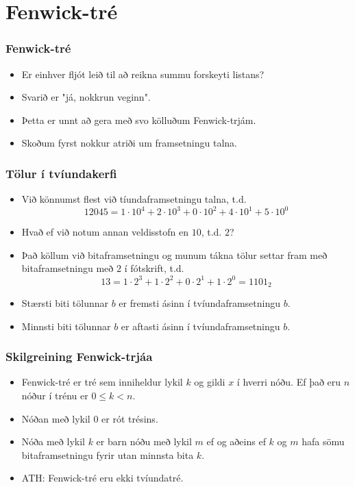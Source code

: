 \documentclass{beamer}
\begin{document}
\section[Fenwick-tré]{Fenwick-tré}

\begin{frame}
	\frametitle{Fenwick-tré}
	\begin{itemize}
		\item<1-> Er einhver fljót leið til að reikna summu forskeyti listans?
		\item<2-> Svarið er "já, nokkrun veginn".
		\item<3-> Þetta er unnt að gera með svo kölluðum Fenwick-trjám.
		\item<4-> Skoðum fyrst nokkur atriði um framsetningu talna.
	\end{itemize}
\end{frame}

\begin{frame}
	\frametitle{Tölur í tvíundakerfi}
	\begin{itemize}
		\item<1-> Við könnumst flest við tíundaframsetningu talna, t.d.
			\[
				12045 = 1\cdot 10^4 + 2\cdot 10^3 + 0\cdot 10^2 + 4\cdot 10^1 + 5\cdot 10^0
			\]
		\item<2-> Hvað ef við notum annan veldisstofn en $10$, t.d. $2$?
		\item<3-> Það köllum við bitaframsetningu og munum tákna tölur settar fram með bitaframsetningu með $2$ í fótskrift, t.d.
			\[
				13 = 
				1\cdot 2^3 + 
				1\cdot 2^2 + 
				0\cdot 2^1 + 
				1\cdot 2^0 
				= 1101_2
			\]
		\item<4-> Stærsti biti tölunnar $b$ er fremsti ásinn í tvíundaframsetningu $b$.
		\item<5-> Minnsti biti tölunnar $b$ er aftasti ásinn í tvíundaframsetningu $b$.
	\end{itemize}
\end{frame}

\begin{frame}
	\frametitle{Skilgreining Fenwick-trjáa}
	\begin{itemize}
		\item<1-> Fenwick-tré er tré sem inniheldur lykil $k$ og gildi $x$ í hverri nóðu. Ef það eru $n$ nóður
			í trénu er $0 \leq k < n$.
		\item<2-> Nóðan með lykil $0$ er rót trésins.
		\item<3-> Nóða með lykil $k$ er barn nóðu með lykil $m$ ef og aðeins ef $k$ og $m$ hafa sömu bitaframsetningu
			fyrir utan minnsta bita $k$.
		\item<4-> ATH: Fenwick-tré eru ekki tvíundatré.
	\end{itemize}
\end{frame}
\end{document}
